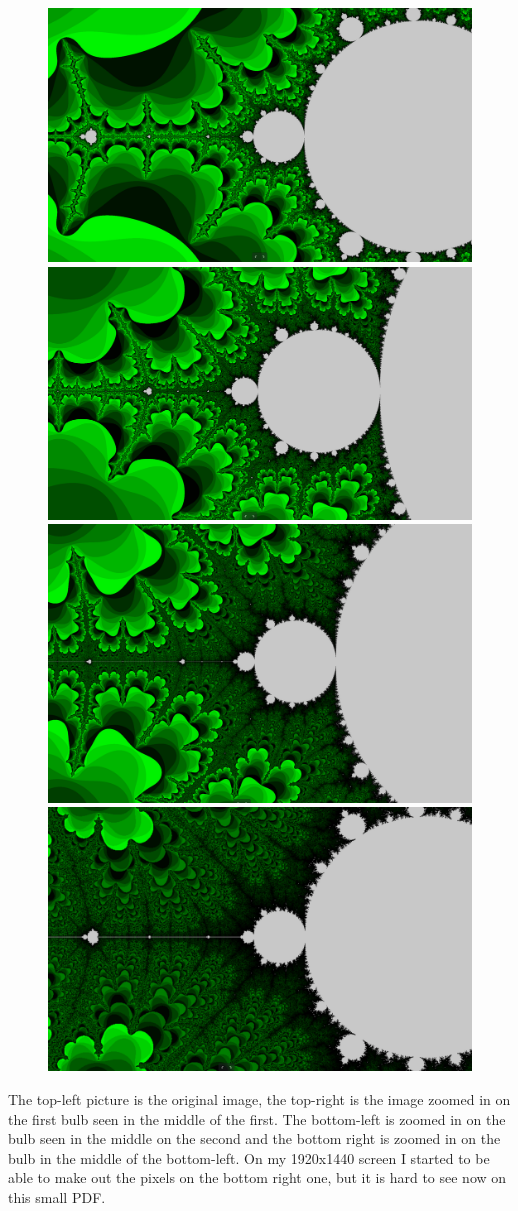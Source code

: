 \documentclass{article}
\begin{document}
\begin{figure}[H]
  \centering
  \includegraphics[width=0.48\linewidth]{original_mandelbrot.png}
  \includegraphics[width=0.48\linewidth]{mandelbrot_zoom_1.png}
  \includegraphics[width=0.48\linewidth]{mandelbrot_zoom_2.png}
  \includegraphics[width=0.48\linewidth]{mandelbrot_zoom_3.png}
\end{figure}

The top-left picture is the original image, the top-right is the image zoomed in on the first
bulb seen in the middle of the first. The bottom-left is zoomed in on the bulb seen in the
middle on the second and the bottom right is zoomed in on the bulb in the middle of the
bottom-left. On my 1920x1440 screen I started to be able to make out the pixels on the bottom
right one, but it is hard to see now on this small PDF.
\end{document}
